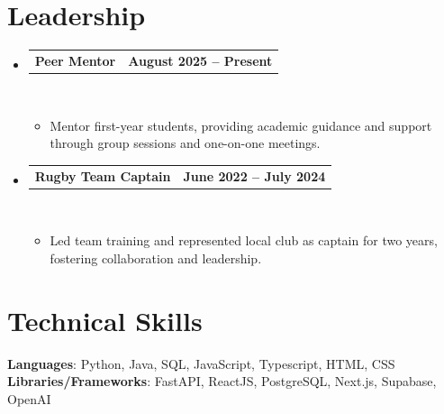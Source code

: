 \documentclass[letterpaper,11pt]{article}
\makeatletter
\newcommand{\resumeItem}[1]{
  \item\small{
    {#1 \vspace{0pt}}
  }
}
\newcommand{\resumeProjectHeading}[2]{
    \item
    \begin{tabular*}{1.001\textwidth}{l@{\extracolsep{\fill}}r}
      \small#1 & \textbf{\small #2}\\
    \end{tabular*}\vspace{-7pt}
}
\newcommand{\resumeSubHeadingListStart}{\begin{itemize}[leftmargin=0.0in, label={}]}
\newcommand{\resumeSubHeadingListEnd}{\end{itemize}}\vspace{0pt}
\newcommand{\resumeItemListStart}{\begin{itemize}}
\newcommand{\resumeItemListEnd}{\end{itemize}\vspace{-5pt}}
\makeatother
\begin{document}
\section{Leadership} 
    \resumeSubHeadingListStart
        \resumeProjectHeading
            {\textbf{Peer Mentor}}{August 2025 -- Present}
            \\[2mm]
            \resumeItemListStart
                \resumeItem{Mentor first-year students, providing academic guidance and support through group sessions and one-on-one meetings.}
            \resumeItemListEnd
            \vspace{-10pt}
        \resumeProjectHeading
            {\textbf{Rugby Team Captain}}{June 2022 -- July 2024}
            \\[2mm]
            \resumeItemListStart
                \resumeItem{Led team training and represented local club as captain for two years, fostering collaboration and leadership.}
            \resumeItemListEnd
            \vspace{-10pt}

    \resumeSubHeadingListEnd

\section{Technical Skills}
 \begin{itemize}[leftmargin=0.15in, label={}]
    \small{\item{   
     \textbf{Languages}{: Python, Java, SQL, JavaScript, Typescript, HTML, CSS} \\[1mm]
     \textbf{Libraries/Frameworks}{: FastAPI, ReactJS, PostgreSQL, Next.js, Supabase, OpenAI} \\ [1mm]
    }}
 \end{itemize}
 \vspace{-16pt}
 \vspace{3pt}
\vspace{10pt}
\end{document}
